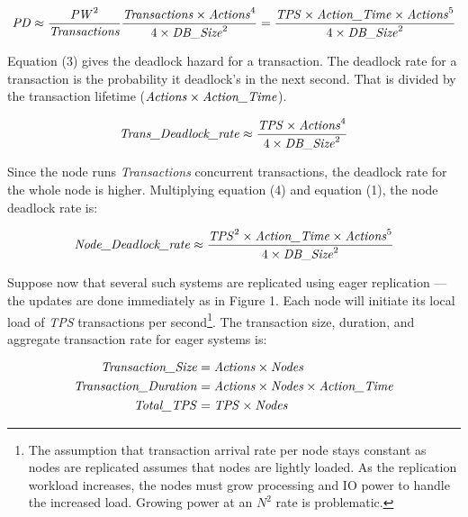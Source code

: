 \documentclass[a4paper,11pt,twoside,openright]{article}
\begin{document}
\begin{equation}
\text{\emph{PD}} \approx \frac{\text{\emph{PW}}^2}{\text{\emph{Transactions}}} \frac{\text{\emph{Transactions}} \times \text{\emph{Actions}}^4}{4 \times \text{\emph{DB\_Size}}^2}
   = \frac{\text{\emph{TPS}} \times \text{\emph{Action\_Time}} \times \text{\emph{Actions}}^5}{4 \times \text{\emph{DB\_Size}}^2}
\end{equation}

Equation (3) gives the deadlock hazard for a transaction. The deadlock
rate for a transaction is the probability it deadlock's in the next
second. That is  divided by the transaction lifetime
(\(\text{\emph{Actions}} \times \text{\emph{Action\_Time}}\)).

\begin{equation}
\text{\emph{Trans\_Deadlock\_rate}} \approx \frac{\text{\emph{TPS}} \times \text{\emph{Actions}}^4}{4 \times \text{\emph{DB\_Size}}^2}
\end{equation}

Since the node runs \emph{Transactions} concurrent transactions, the
deadlock rate for the whole node is higher. Multiplying equation (4) and
equation (1), the node deadlock rate is:

\begin{equation}
\text{\emph{Node\_Deadlock\_rate}} \approx \frac{\text{\emph{TPS}}^2 \times \text{\emph{Action\_Time}} \times \text{\emph{Actions}}^5}{4 \times \text{\emph{DB\_Size}}^2}
\end{equation}

Suppose now that several such systems are replicated using eager
replication --- the updates are done immediately as in Figure 1. Each
node will initiate its local load of \emph{TPS} transactions per
second\footnote{The assumption that transaction arrival rate per node
  stays constant as nodes are replicated assumes that nodes are lightly
  loaded. As the replication workload increases, the nodes must grow
  processing and IO power to handle the increased load. Growing power at
  an \(N^2\) rate is problematic.}. The transaction
size, duration, and aggregate transaction rate for eager systems is:

\begin{equation}
\begin{aligned}
\text{\emph{Transaction\_Size}} &= \text{\emph{Actions}} \times \text{\emph{Nodes}}\\
\text{\emph{Transaction\_Duration}} &= \text{\emph{Actions}} \times \text{\emph{Nodes}} \times \text{\emph{Action\_Time}}\\
\text{\emph{Total\_TPS}} &= \text{\emph{TPS}} \times \text{\emph{Nodes}}
\end{aligned}
\end{equation}
\end{document}
